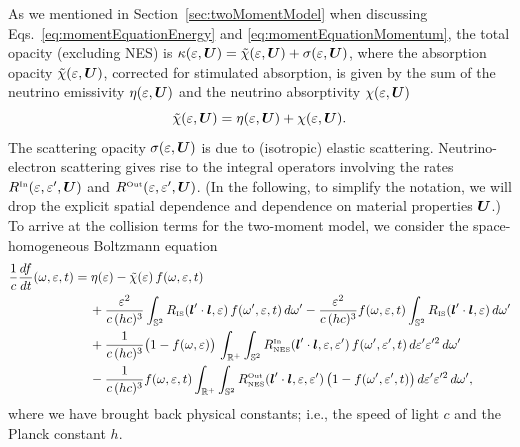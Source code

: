 \documentclass[10pt,preprint]{aastex}
\newcommand{\NES}{\mbox{\tiny NES}}
\begin{document}
As we mentioned in Section~\ref{sec:twoMomentModel} when discussing Eqs.~\eqref{eq:momentEquationEnergy} and \eqref{eq:momentEquationMomentum}, the total opacity (excluding NES) is $\kappa(\varepsilon,\boldsymbol{U})=\tilde{\chi}(\varepsilon,\boldsymbol{U})+\sigma(\varepsilon,\boldsymbol{U})$, where the absorption opacity $\tilde{\chi}(\varepsilon,\boldsymbol{U})$, corrected for stimulated absorption, is given by the sum of the neutrino emissivity $\eta(\varepsilon,\boldsymbol{U})$ and the neutrino absorptivity $\chi(\varepsilon,\boldsymbol{U})$
\begin{equation}
  \tilde{\chi}(\varepsilon,\boldsymbol{U}) = \eta(\varepsilon,\boldsymbol{U}) + \chi(\varepsilon,\boldsymbol{U}). 
\end{equation}
The scattering opacity $\sigma(\varepsilon,\boldsymbol{U})$ is due to (isotropic) elastic scattering.   
Neutrino-electron scattering gives rise to the integral operators involving the rates $R^{\mbox{\tiny In}}(\varepsilon,\varepsilon',\boldsymbol{U})$ and $R^{\mbox{\tiny Out}}(\varepsilon,\varepsilon',\boldsymbol{U})$.  
(In the following, to simplify the notation, we will drop the explicit spatial dependence and dependence on material properties $\boldsymbol{U}$.)  
To arrive at the collision terms for the two-moment model, we consider the space-homogeneous Boltzmann equation \citep[e.g., Eq.~(7) in][]{mezzacappaBruenn_1993c}
\begin{align}
  \f{1}{c}\deriv{f}{t}(\omegaNu,\epsilonNu,t)
  & = \eta(\epsilonNu) - \tilde{\chi}(\epsilonNu)\,f(\omegaNu,\epsilonNu,t) \nonumber \\
  & \hspace{12pt}
  + \frac{\epsilonNu^2}{c\,(hc)^3} \int_{\bbS^{2}} R_{\IS}(\bl'\cdot\bl,\epsilonNu)\,f(\omega', \epsilonNu,t)\,d\omegaNu'
  - \frac{\epsilonNu^2}{c\,(hc)^3} f(\omegaNu,\epsilonNu,t) \int_{\bbS^{2}} R_{\IS}(\bl'\cdot\bl,\epsilonNu)\,d\omega' \nonumber \\
  & \hspace{12pt} 
  + \frac{1}{c\,(hc)^3}\big(1- f(\omegaNu,\epsilonNu)\big) \, 
  \int_{\bbR^{+}} \int_{\bbS^{2}}  R^{\In}_{\NES} (\bl'\cdot\bl,\epsilonNu,\epsilonNu')\,f(\omega',\epsilonNu',t)\,d\epsilonNu' \epsilonNu'^{2}\,d\omega' \nonumber \\
  & \hspace{12pt} 
  - \frac{1}{c\,(hc)^3} f(\omegaNu,\epsilonNu,t) \int_{\bbR^{+}} 
  \int_{\bbS^{2}}  R^{\Out}_{\NES} (\bl'\cdot\bl,\epsilonNu,\epsilonNu^{\prime})\,\big(1-f(\omegaNu',\epsilonNu',t )\big)\,d\epsilonNu' \epsilonNu'^{2}\,d\omegaNu',
  \label{eq:homogeneousBoltzmann}
\end{align}
where we have brought back physical constants; i.e., the speed of light $c$ and the Planck constant $h$.  
\end{document}
